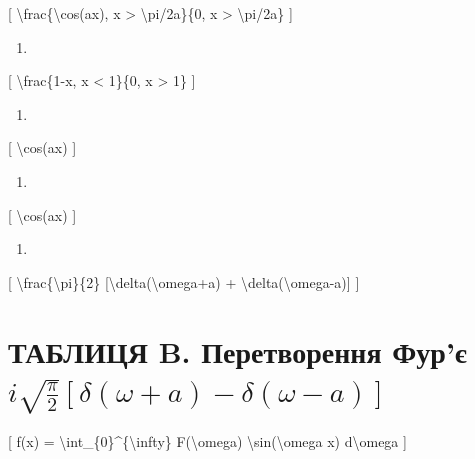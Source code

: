\documentclass[
]{article}
\providecommand{\tightlist}{%
  \setlength{\itemsep}{0pt}\setlength{\parskip}{0pt}}
\begin{document}
{{[} \textbackslash frac\{\textbackslash cos(ax), \textbar x\textbar{}
\textgreater{} \textbackslash pi/2a\}\{0, \textbar x\textbar{}
\textgreater{} \textbackslash pi/2a\} {]}

\begin{enumerate}
\def\labelenumi{\arabic{enumi}.}
\setcounter{enumi}{17}
\tightlist
\item
\end{enumerate}

{[} \textbackslash frac\{1-\textbar x\textbar, \textbar x\textbar{}
\textless{} 1\}\{0, \textbar x\textbar{} \textgreater{} 1\} {]}

\begin{enumerate}
\def\labelenumi{\arabic{enumi}.}
\setcounter{enumi}{18}
\tightlist
\item
\end{enumerate}

{[} \textbackslash cos(ax) {]}

\begin{enumerate}
\def\labelenumi{\arabic{enumi}.}
\setcounter{enumi}{18}
\tightlist
\item
\end{enumerate}

{[} \textbackslash cos(ax) {]}

\begin{enumerate}
\def\labelenumi{\arabic{enumi}.}
\setcounter{enumi}{9}
\tightlist
\item
\end{enumerate}

{[} \textbackslash frac\{\textbackslash pi\}\{2\}
{[}\textbackslash delta(\textbackslash omega+a) +
\textbackslash delta(\textbackslash omega-a){]} {]}

\section{\texorpdfstring{ТАБЛИЦЯ B. Перетворення Фур'є
\(i \sqrt{\frac{\pi}{2}} [\delta(\omega+a) - \delta(\omega-a)]\)}{ТАБЛИЦЯ B. Перетворення Фур'є i \textbackslash sqrt\{\textbackslash frac\{\textbackslash pi\}\{2\}\} {[}\textbackslash delta(\textbackslash omega+a) - \textbackslash delta(\textbackslash omega-a){]}}}\label{ux442ux430ux431ux43bux438ux446ux44f-b.-ux43fux435ux440ux435ux442ux432ux43eux440ux435ux43dux43dux44f-ux444ux443ux440ux454-i-sqrtfracpi2-deltaomegaa---deltaomega-a}

{[} f(x) = \textbackslash int\_\{0\}\^{}\{\textbackslash infty\}
F(\textbackslash omega) \textbackslash sin(\textbackslash omega x)
d\textbackslash omega {]}

}
\end{document}
